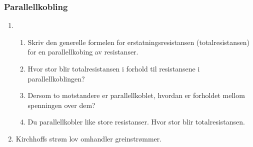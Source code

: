 \documentclass[12pt,a4paper]{article}
\begin{document}
\newpage
\subsubsection{Parallellkobling}
\begin{enumerate}
\item ~

\begin{enumerate}
\item Skriv den generelle formelen for erstatningsresistansen (totalresistansen) for en parallellkobing av resistanser.
\\
\item Hvor stor blir totalresistansen i forhold til resistansene i parallellkoblingen?
\\
\item Dersom to motstandere er parallellkoblet, hvordan er forholdet mellom spenningen over dem?
\\
\item Du parallellkobler like store resistanser. Hvor stor blir totalresistansen. 
\\
\end{enumerate}
\item Kirchhoffs strøm lov omhandler greinstrømmer. 


\end{enumerate}
\end{document}
